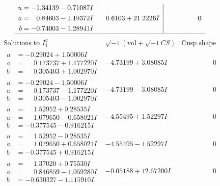 \documentclass[1p]{elsarticle_modified}
\theoremstyle{definition}
\newcommand{\I}{\sqrt{-1}}
\begin{document}
$$\begin{array}{c|c|c}
\begin{aligned}
u &= -1.34139 - 0.71087 I \\
a &= \phantom{-}0.84603 - 1.19372 I \\
b &= -0.74003 - 1.28941 I\end{aligned}
 & \phantom{-}0.6103 + 21.2226 I & \phantom{-0.000000 } 0\\
 \hline 
 \end{array}$$\newpage$$\begin{array}{c|c|c}  
\text{Solutions to }I^u_{1}& \I (\text{vol} + \sqrt{-1}CS) & \text{Cusp shape}\\
 \hline 
\begin{aligned}
u &= -0.29024 + 1.50006 I \\
a &= \phantom{-}0.173737 + 1.177220 I \\
b &= \phantom{-}0.305403 + 1.002970 I\end{aligned}
 & -4.73199 + 3.08085 I & \phantom{-0.000000 } 0 \\ \hline\begin{aligned}
u &= -0.29024 - 1.50006 I \\
a &= \phantom{-}0.173737 - 1.177220 I \\
b &= \phantom{-}0.305403 - 1.002970 I\end{aligned}
 & -4.73199 - 3.08085 I & \phantom{-0.000000 } 0 \\ \hline\begin{aligned}
u &= \phantom{-}1.52952 + 0.28535 I \\
a &= \phantom{-}1.079650 - 0.658021 I \\
b &= -0.377545 - 0.916215 I\end{aligned}
 & -4.55495 + 1.52297 I & \phantom{-0.000000 } 0 \\ \hline\begin{aligned}
u &= \phantom{-}1.52952 - 0.28535 I \\
a &= \phantom{-}1.079650 + 0.658021 I \\
b &= -0.377545 + 0.916215 I\end{aligned}
 & -4.55495 - 1.52297 I & \phantom{-0.000000 } 0 \\ \hline\begin{aligned}
u &= \phantom{-}1.37020 + 0.75530 I \\
a &= \phantom{-}0.846859 - 1.059280 I \\
b &= -0.630327 - 1.115910 I\end{aligned}
 & -0.05188 + 12.67200 I & \phantom{-0.000000 } 0 \\ \hline\begin{aligned}

\end{aligned}
\end{array}$$
\end{document}
